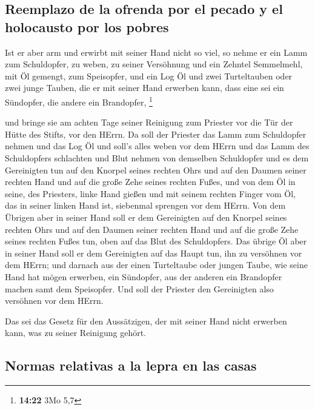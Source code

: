 \hypertarget{reemplazo-de-la-ofrenda-por-el-pecado-y-el-holocausto-por-los-pobres}{%
\subsection{Reemplazo de la ofrenda por el pecado y el holocausto por
los
pobres}\label{reemplazo-de-la-ofrenda-por-el-pecado-y-el-holocausto-por-los-pobres}}

 Ist er aber arm und erwirbt mit seiner Hand nicht so
viel, so nehme er ein Lamm zum Schuldopfer, zu weben, zu seiner
Versöhnung und ein Zehntel Semmelmehl, mit Öl gemengt, zum Speisopfer,
und ein Log Öl  und zwei Turteltauben oder zwei junge
Tauben, die er mit seiner Hand erwerben kann, dass eine sei ein
Sündopfer, die andere ein Brandopfer, \footnote{\textbf{14:22} 3Mo 5,7}

 und bringe sie am achten Tage seiner Reinigung zum
Priester vor die Tür der Hütte des Stifts, vor den HErrn.
 Da soll der Priester das Lamm zum Schuldopfer nehmen und
das Log Öl und soll's alles weben vor dem HErrn  und das
Lamm des Schuldopfers schlachten und Blut nehmen von demselben
Schuldopfer und es dem Gereinigten tun auf den Knorpel seines rechten
Ohrs und auf den Daumen seiner rechten Hand und auf die große Zehe
seines rechten Fußes,  und von dem Öl in seine, des
Priesters, linke Hand gießen  und mit seinem rechten
Finger vom Öl, das in seiner linken Hand ist, siebenmal sprengen vor dem
HErrn.  Von dem Übrigen aber in seiner Hand soll er dem
Gereinigten auf den Knorpel seines rechten Ohrs und auf den Daumen
seiner rechten Hand und auf die große Zehe seines rechten Fußes tun,
oben auf das Blut des Schuldopfers.  Das übrige Öl aber
in seiner Hand soll er dem Gereinigten auf das Haupt tun, ihn zu
versöhnen vor dem HErrn;  und darnach aus der einen
Turteltaube oder jungen Taube, wie seine Hand hat mögen erwerben,
 ein Sündopfer, aus der anderen ein Brandopfer machen
samt dem Speisopfer. Und soll der Priester den Gereinigten also
versöhnen vor dem HErrn.

 Das sei das Gesetz für den Aussätzigen, der mit seiner
Hand nicht erwerben kann, was zu seiner Reinigung gehört.

\hypertarget{normas-relativas-a-la-lepra-en-las-casas}{%
\subsection{Normas relativas a la lepra en las
casas}\label{normas-relativas-a-la-lepra-en-las-casas}}

